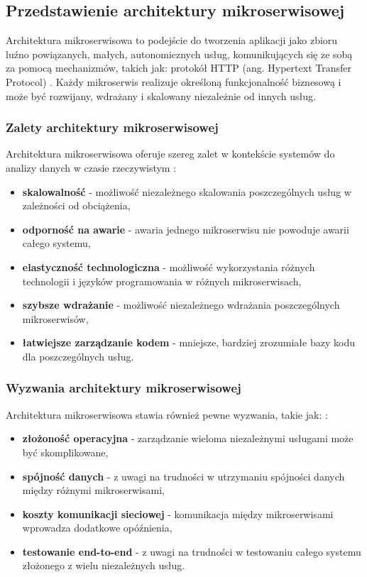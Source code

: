 \subsection{Przedstawienie architektury mikroserwisowej}
\label{subsec:architektura_mikroserwisowa}

Architektura mikroserwisowa to podejście do tworzenia aplikacji jako zbioru luźno powiązanych, małych, autonomicznych usług,
komunikujących się ze sobą za pomocą mechanizmów, takich jak: protokół HTTP (ang. Hypertext Transfer Protocol) \cite{microservice_architecture}.
Każdy mikroserwis realizuje określoną funkcjonalność biznesową i może być rozwijany, wdrażany i skalowany niezależnie od innych usług.

\subsubsection{Zalety architektury mikroserwisowej}
\label{subsubsec:zalety_mikroserwisow}

Architektura mikroserwisowa oferuje szereg zalet w kontekście systemów do analizy danych w czasie rzeczywistym \cite{microservice_benefits}:

\begin{itemize}
    \item \textbf{skalowalność} - możliwość niezależnego skalowania poszczególnych usług w zależności od obciążenia,
    \item \textbf{odporność na awarie} - awaria jednego mikroserwisu nie powoduje awarii całego systemu,
    \item \textbf{elastyczność technologiczna} - możliwość wykorzystania różnych technologii i języków programowania w różnych mikroserwisach,
    \item \textbf{szybsze wdrażanie} - możliwość niezależnego wdrażania poszczególnych mikroserwisów,
    \item \textbf{łatwiejsze zarządzanie kodem} - mniejsze, bardziej zrozumiałe bazy kodu dla poszczególnych usług.
\end{itemize}

\subsubsection{Wyzwania architektury mikroserwisowej}
\label{subsubsec:wyzwania_mikroserwisow}

Architektura mikroserwisowa stawia również pewne wyzwania, takie jak: \cite{microservice_challenges}:

\begin{itemize}
    \item \textbf{złożoność operacyjna} - zarządzanie wieloma niezależnymi usługami może być skomplikowane,
    \item \textbf{spójność danych} - z uwagi na trudności w utrzymaniu spójności danych między różnymi mikroserwisami,
    \item \textbf{koszty komunikacji sieciowej} - komunikacja między mikroserwisami wprowadza dodatkowe opóźnienia,
    \item \textbf{testowanie end-to-end} - z uwagi na trudności w testowaniu całego systemu złożonego z wielu niezależnych usług.
\end{itemize}


